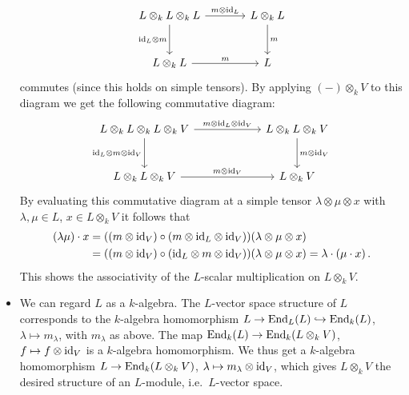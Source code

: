 \begin{fluff}
\begin{itemize}
      \[
        \begin{tikzcd}[sep = large]
            L \otimes_k L \otimes_k L
            \arrow{r}[above]{m \otimes \id_L}
            \arrow{d}[left]{{\id_L} \otimes m}
          & L \otimes_k L
            \arrow{d}{m}
          \\
            L \otimes_k L
            \arrow{r}{m}
          & L
        \end{tikzcd}
      \]
      commutes (since this holds on simple tensors).
      By applying $(-) \otimes_k V$ to this diagram we get the following commutative diagram:
      \[
        \begin{tikzcd}[row sep = large, column sep = 6em]
            L \otimes_k L \otimes_k L \otimes_k V
            \arrow{r}[above]{m \otimes {\id_L} \otimes \id_V}
            \arrow{d}[left]{{\id_L} \otimes m \otimes \id_V}
          & L \otimes_k L \otimes_k V
            \arrow{d}{m \otimes \id_V}
          \\
            L \otimes_k L \otimes_k V
            \arrow{r}{m \otimes \id_V}
          & L \otimes_k V
        \end{tikzcd}
      \]
      By evaluating this commutative diagram at a simple tensor $\lambda \otimes \mu \otimes x$ with $\lambda, \mu \in L$, $x \in L \otimes_k V$ it follows that
      \begin{align*}
            (\lambda \mu) \cdot x
        &=  ( (m \otimes \operatorname{id}_V) \circ (m \otimes {\operatorname{id}_L} \otimes \operatorname{id}_V) )(\lambda \otimes \mu \otimes x)  \\
        &=  ( (m \otimes \operatorname{id}_V) \circ ({\operatorname{id}_L} \otimes m \otimes \operatorname{id}_V) )(\lambda \otimes \mu \otimes x)
         =  \lambda \cdot (\mu \cdot x) \,.
      \end{align*}
      This shows the associativity of the $L$-scalar multiplication on $L \otimes_k V$.
    \item
      We can regard $L$ as a $k$-algebra.
      The $L$-vector space structure of $L$ corresponds to the $k$-algebra homomorphism $L \to \operatorname{End}_L(L) \hookrightarrow \operatorname{End}_k(L)$, $\lambda \mapsto m_\lambda$, with $m_\lambda$ as above.
      The map $\operatorname{End}_k(L) \to \operatorname{End}_k(L \otimes_k V)$, $f \mapsto f \otimes \operatorname{id}_V$ is a $k$-algebra homomorphism.
      We thus get a $k$-algebra homomorphism $L \to \operatorname{End}_k(L \otimes_k V)$, $\lambda \mapsto m_\lambda \otimes \operatorname{id}_V$, which gives $L \otimes_k V$ the desired structure of an $L$-module, i.e.\ $L$-vector space.
  \end{itemize}
\end{fluff}


